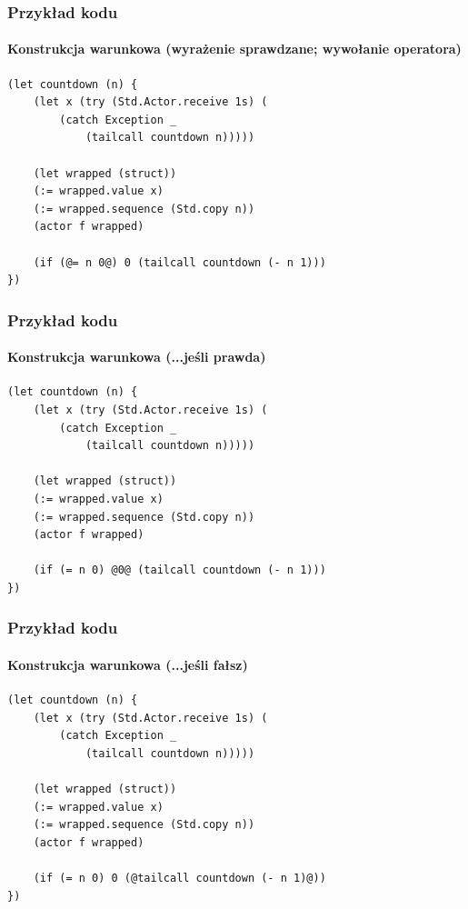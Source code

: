 \documentclass[aspectratio=169]{beamer}
\begin{document}
\begin{frame}[fragile]
    \frametitle{Przykład kodu}
    \framesubtitle{Konstrukcja warunkowa (wyrażenie sprawdzane; wywołanie operatora)}

    \begin{small}
    \begin{lstlisting}
(let countdown (n) {
    (let x (try (Std.Actor.receive 1s) (
        (catch Exception _
            (tailcall countdown n)))))

    (let wrapped (struct))
    (:= wrapped.value x)
    (:= wrapped.sequence (Std.copy n))
    (actor f wrapped)

    (if (@= n 0@) 0 (tailcall countdown (- n 1)))
})
    \end{lstlisting}
    \end{small}
\end{frame}

\begin{frame}[fragile]
    \frametitle{Przykład kodu}
    \framesubtitle{Konstrukcja warunkowa (...jeśli prawda)}

    \begin{small}
    \begin{lstlisting}
(let countdown (n) {
    (let x (try (Std.Actor.receive 1s) (
        (catch Exception _
            (tailcall countdown n)))))

    (let wrapped (struct))
    (:= wrapped.value x)
    (:= wrapped.sequence (Std.copy n))
    (actor f wrapped)

    (if (= n 0) @0@ (tailcall countdown (- n 1)))
})
    \end{lstlisting}
    \end{small}
\end{frame}

\begin{frame}[fragile]
    \frametitle{Przykład kodu}
    \framesubtitle{Konstrukcja warunkowa (...jeśli fałsz)}

    \begin{small}
    \begin{lstlisting}
(let countdown (n) {
    (let x (try (Std.Actor.receive 1s) (
        (catch Exception _
            (tailcall countdown n)))))

    (let wrapped (struct))
    (:= wrapped.value x)
    (:= wrapped.sequence (Std.copy n))
    (actor f wrapped)

    (if (= n 0) 0 (@tailcall countdown (- n 1)@))
})
    \end{lstlisting}
    \end{small}
\end{frame}
\end{document}
